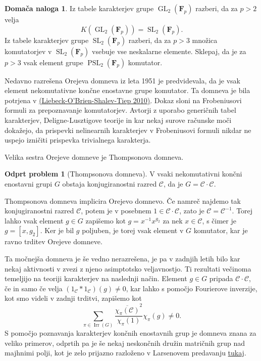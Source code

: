 \documentclass[11pt]{book}
\def\conclass{\mathcal{C}}
\def\FF{\mathbf{F}}
\DeclareMathOperator\Irr{Irr}
\DeclareMathOperator\GL{GL}
\DeclareMathOperator\SL{SL}
\DeclareMathOperator\PSL{PSL}
\theoremstyle{definition}
\theoremstyle{zgled}
\theoremstyle{zgledbrezstevilke}
\theoremstyle{odprtproblem}
\newtheorem{odprtproblem}[theorem]{Odprt problem}
\theoremstyle{domacanaloga}
\newtheorem{domacanaloga}[theorem]{Domača naloga}
\theoremstyle{izrek}
\begin{document}
\begin{domacanaloga}
Iz tabele karakterjev grupe $\GL_2(\FF_p)$ razberi, da za $p>2$ velja
\[
    \textstyle K(\GL_2(\FF_p)) = \SL_2(\FF_p).
\]
Iz tabele karakterjev grupe $\SL_2(\FF_p)$ razberi, da za $p>3$ množica komutatorjev v $\SL_2(\FF_p)$ vsebuje vse neskalarne elemente. Sklepaj, da je za $p>3$ vsak element grupe $\PSL_2(\FF_p)$ komutator.
\end{domacanaloga}

Nedavno razrešena Orejeva domneva iz leta 1951 je predvidevala, da je vsak element nekomutativne končne enostavne grupe komutator. Ta domneva je bila potrjena v \href{https://ems.press/journals/jems/articles/3979}{(Liebeck-O'Brien-Shalev-Tiep 2010)}. Dokaz sloni na Frobeniusovi formuli za prepoznavanje komutatorjev. Avtorji z uporabo generičnih tabel karakterjev, Deligne-Lusztigove teorije in kar nekaj surove računske moči dokažejo, da prispevki nelinearnih karakterjev v Frobeniusovi formuli nikdar ne uspejo izničiti prispevka trivialnega karakterja.

Velika sestra Orejeve domneve je Thompsonova domneva.

\begin{odprtproblem}[Thompsonova domneva]
V vsaki nekomutativni končni enostavni grupi $G$ obstaja konjugiranostni razred $\conclass$, da je $G = \conclass \cdot \conclass$.
\end{odprtproblem}

Thompsonova domneva implicira Orejevo domnevo. Če namreč najdemo tak konjugiranostni razred $\conclass$, potem je v posebnem $1 \in \conclass \cdot \conclass$, zato je $\conclass = \conclass^{-1}$. Torej lahko vsak element $g \in G$ zapišemo kot $g = x^{-1} x^{g_2}$ za nek $x \in \conclass$, s čimer je $g = [x, g_2]$. Ker je bil $g$ poljuben, je torej vsak element v $G$ komutator, kar je ravno trditev Orejeve domneve. 

Ta močnejša domneva je še vedno nerazrešena, je pa v zadnjih letih bilo kar nekaj aktivnosti v zvezi z njeno asimptotsko veljavnostjo. Ti rezultati večinoma temeljijo na teoriji karakterjev na naslednji način. Element $g \in G$ pripada $\conclass \cdot \conclass$, če in samo če velja $(1_{\conclass} * 1_{\conclass})(g) \neq 0$, kar lahko s pomočjo Fourierove inverzije, kot smo videli v zadnji trditvi, zapišemo kot
\[
    \sum_{\pi \in \Irr(G)} \frac{\overline{\chi_{\pi}(\conclass)}^2}{\chi_{\pi}(1)} \chi_{\pi}(g) \neq 0.
\]
S pomočjo poznavanja karakterjev končnih enostavnih grup je domneva znana za veliko primerov, odprtih pa je še nekaj neskončnih družin matričnih grup nad majhnimi polji, kot je zelo prijazno razloženo v Larsenovem predavanju \href{https://www.youtube.com/watch?v=OQFFYaCYzq4}{tukaj}.
\end{document}

